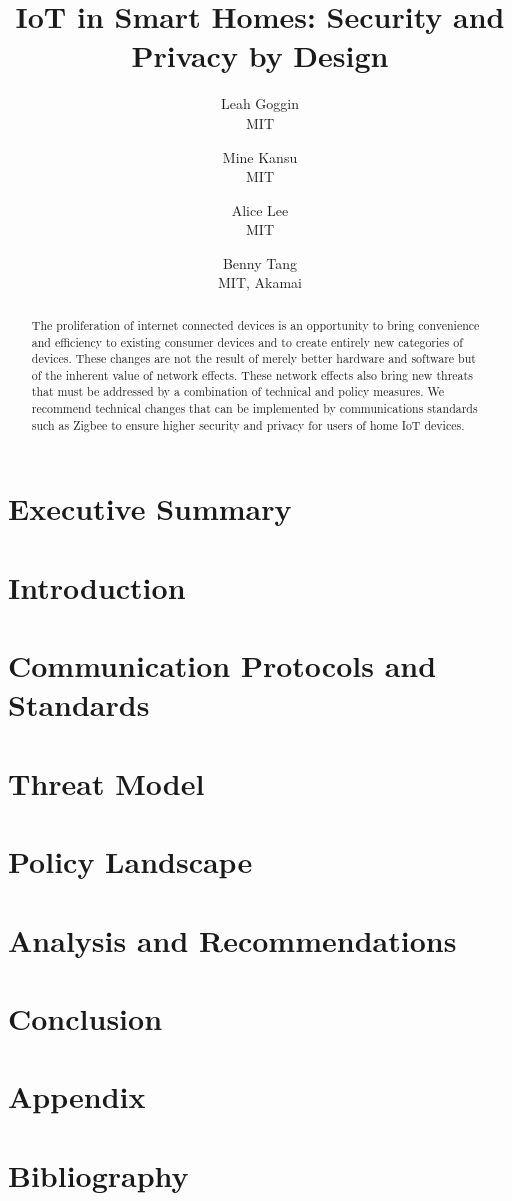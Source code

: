 \documentclass{article}
\title{IoT in Smart Homes: Security and Privacy by Design}
\author{
	Leah Goggin\\
	MIT
	\and
	Mine Kansu\\
	MIT
	\and
	Alice Lee\\
	MIT
	\and
	Benny Tang\\
	MIT, Akamai
}
\begin{document}
\begin{titlingpage}
	\maketitle
	\begin{abstract}
The proliferation of internet connected devices is an opportunity to bring convenience and efficiency to existing consumer devices and to create entirely new categories of devices. These changes are not the result of merely better hardware and software but of the inherent value of network effects. These network effects also bring new threats that must be addressed by a combination of technical and policy measures. We recommend technical changes that can be implemented by communications standards such as Zigbee to ensure higher security and privacy for users of home IoT devices.
	\end{abstract}
\end{titlingpage}

\section*{Executive Summary}


\newpage
\tableofcontents
\newpage

\section{Introduction}


\section{Communication Protocols and Standards}


\section{Threat Model}


\section{Policy Landscape}


\section{Analysis and Recommendations}

\section{Conclusion}


\newpage
\section{Appendix}

\section*{Bibliography}

\end{document}
